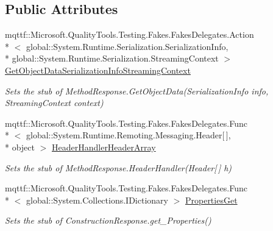 \subsection*{Public Attributes}
\begin{DoxyCompactItemize}
\item 
mqttf\-::\-Microsoft.\-Quality\-Tools.\-Testing.\-Fakes.\-Fakes\-Delegates.\-Action\\*
$<$ global\-::\-System.\-Runtime.\-Serialization.\-Serialization\-Info, \\*
global\-::\-System.\-Runtime.\-Serialization.\-Streaming\-Context $>$ \hyperlink{class_system_1_1_runtime_1_1_remoting_1_1_messaging_1_1_fakes_1_1_stub_construction_response_a3f305665acc0e75ef4681b9ebc025634}{Get\-Object\-Data\-Serialization\-Info\-Streaming\-Context}
\begin{DoxyCompactList}\small\item\em Sets the stub of Method\-Response.\-Get\-Object\-Data(\-Serialization\-Info info, Streaming\-Context context)\end{DoxyCompactList}\item 
mqttf\-::\-Microsoft.\-Quality\-Tools.\-Testing.\-Fakes.\-Fakes\-Delegates.\-Func\\*
$<$ global\-::\-System.\-Runtime.\-Remoting.\-Messaging.\-Header\mbox{[}$\,$\mbox{]}, \\*
object $>$ \hyperlink{class_system_1_1_runtime_1_1_remoting_1_1_messaging_1_1_fakes_1_1_stub_construction_response_ab62847d453edf02ccad165c2de3f1c1d}{Header\-Handler\-Header\-Array}
\begin{DoxyCompactList}\small\item\em Sets the stub of Method\-Response.\-Header\-Handler(\-Header\mbox{[}$\,$\mbox{]} h)\end{DoxyCompactList}\item 
mqttf\-::\-Microsoft.\-Quality\-Tools.\-Testing.\-Fakes.\-Fakes\-Delegates.\-Func\\*
$<$ global\-::\-System.\-Collections.\-I\-Dictionary $>$ \hyperlink{class_system_1_1_runtime_1_1_remoting_1_1_messaging_1_1_fakes_1_1_stub_construction_response_aedb82288ca97852ed4c63ef812519ffc}{Properties\-Get}
\begin{DoxyCompactList}\small\item\em Sets the stub of Construction\-Response.\-get\-\_\-\-Properties()\end{DoxyCompactList}\end{DoxyCompactItemize}
